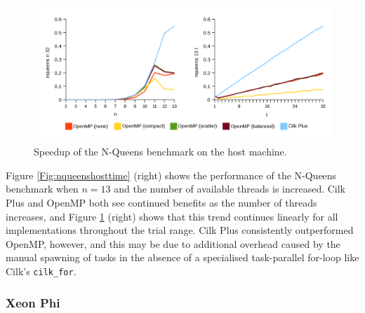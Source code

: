 \documentclass{report}
\begin{document}
\noindent
\begin{figure}[t!]
	\includegraphics[width=\linewidth]{../../charts/intel64/nqueens_speedup}
	\caption{Speedup of the N-Queens benchmark on the host machine.}
	\label{Fig:nqueenshostspeedup}
\end{figure}

Figure \ref{Fig:nqueenshosttime} (right) shows the performance of the N-Queens benchmark when \(n=13\) and the number of available threads is increased. Cilk Plus and OpenMP both see continued benefits as the number of threads increases, and Figure \ref{Fig:nqueenshostspeedup} (right) shows that this trend continues linearly for all implementations throughout the trial range. Cilk Plus consistently outperformed OpenMP, however, and this may be due to additional overhead caused by the manual spawning of tasks in the absence of a specialised task-parallel for-loop like Cilk's \verb!cilk_for!.

\subsubsection{Xeon Phi}
\end{document}
